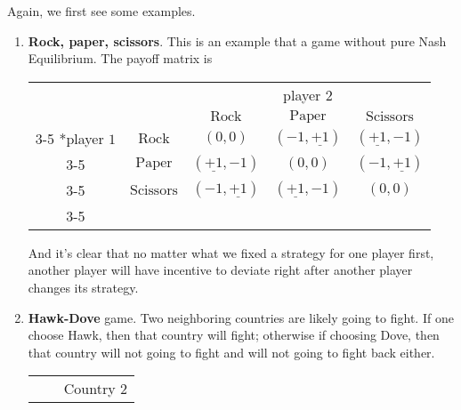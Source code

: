 \begin{eg}
	Again, we first see some examples.
	\begin{enumerate}
		\item \textbf{Rock, paper, scissors}. This is an example that a game without pure Nash Equilibrium. The payoff matrix is
		      \begin{table}[H]
			      \centering
			      \setlength{\extrarowheight}{2pt}
			      \begin{tabular}{cc|c|c|c|}
				                                & \multicolumn{1}{c}{} & \multicolumn{3}{c}{player $2$}                                                                                       \\
				                                & \multicolumn{1}{c}{} & \multicolumn{1}{c}{$\mathrm{Rock}$} & \multicolumn{1}{c}{$\mathrm{Paper}$} & \multicolumn{1}{c}{$\mathrm{Scissors}$} \\\cline{3-5}
				      \multirow{3}*{player $1$} & $\mathrm{Rock}$      & $(0, 0)$                            & $(-1, \underline{+1})$               & $(\underline{+1}, -1)$                  \\\cline{3-5}
				                                & $\mathrm{Paper}$     & $(\underline{+1}, -1)$              & $(0, 0)$                             & $(-1, \underline{+1})$                  \\\cline{3-5}
				                                & $\mathrm{Scissors}$  & $(-1, \underline{+1})$              & $(\underline{+1}, -1)$               & $(0, 0)$                                \\\cline{3-5}
			      \end{tabular}
		      \end{table}
		      And it's clear that no matter what we fixed a strategy for one player first, another player will have incentive to deviate right after another player changes its strategy.
		\item \textbf{Hawk-Dove} game. Two neighboring countries are likely going to fight. If one choose Hawk, then that country will fight; otherwise if choosing Dove, then that country will not
		      going to fight and will not going to fight back either.
		      \begin{table}[H]
			      \centering
			      \setlength{\extrarowheight}{2pt}
			      \begin{tabular}{cc|c|c|}
				                                 & \multicolumn{1}{c}{} & \multicolumn{2}{c}{Country $2$}                           \\

\end{tabular}
\end{table}
\end{enumerate}
\end{eg}
